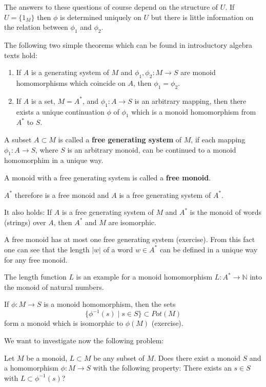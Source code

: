 The answers to these questions of course depend on the structure of $U$. If
$U = \{ 1_M \}$ then $\phi$ is determined uniquely on $U$ but there is
little information on the relation between $\phi_1$ and $\phi_2$.

The following two simple theorems which can be found in introductory algebra
texts hold:
\begin{enumerate}
  \item If $A$ is a generating system of $M$ and $\phi_1, \phi_2 : M \to S$ are
  monoid homomorphisms which coincide on $A$, then $\phi_1 = \phi_2$.
  \item If $A$ is a set, $M = A^*$, and $\phi_1 : A \to S$ is an arbitrary
  mapping, then there exists a unique continuation $\phi$ of $\phi_1$ which is
  a monoid homomorphism from $A^*$ to $S$.
\end{enumerate}

\begin{definition}
A subset $A \subset M$ is called a {\bf free generating system} of $M$, if each
mapping $\phi_1 : A \to S$, where $S$ is an arbitrary monoid, can be continued
to a monoid homomorphim in a unique way. 
\end{definition}

A monoid with a free generating system is called a {\bf free monoid}.

$A^*$ therefore is a free monoid and $A$ is a free generating system of $A^*$.

It also holds: If $A$ is a free generating system of $M$ and $A^*$ is the
monoid of words (strings) over $A$, then $A^*$ and $M$ are isomorphic.

A free monoid has at most one free generating system (exercise). From this fact
one can see that the length $|w|$ of a word $w \in A^*$ can be defined in a unique way for any
free monoid.

The length function $L$ is an example for a monoid homomorphism $L : A^* \to
\mathbb{N}$ into the monoid of natural numbers.

If $\phi : M \to S$ is a monoid homomorphism, then the sets 
\[\{ \phi^{-1}(s) \mid s \in S \} \subset Pot(M) \]
form a monoid which is isomorphic to $\phi(M)$ (exercise).

We want to investigate now the following problem:

Let $M$ be a monoid, $L \subset M$ be any subset of $M$. Does there exist a
monoid $S$ and a homomorphism $\phi : M \to S$ with the following property:
There exists an $s \in S$ with $L \subset \phi^{-1}(s)$?

